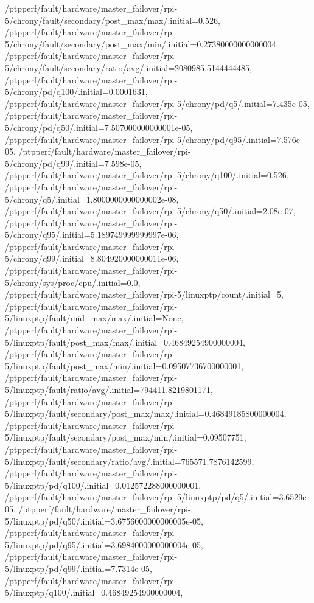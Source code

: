 {    /ptpperf/fault/hardware/master_failover/rpi-5/chrony/fault/secondary/post_max/max/.initial=0.526,
    /ptpperf/fault/hardware/master_failover/rpi-5/chrony/fault/secondary/post_max/min/.initial=0.27380000000000004,
    /ptpperf/fault/hardware/master_failover/rpi-5/chrony/fault/secondary/ratio/avg/.initial=2080985.5144444485,
    /ptpperf/fault/hardware/master_failover/rpi-5/chrony/pd/q100/.initial=0.0001631,
    /ptpperf/fault/hardware/master_failover/rpi-5/chrony/pd/q5/.initial=7.435e-05,
    /ptpperf/fault/hardware/master_failover/rpi-5/chrony/pd/q50/.initial=7.507000000000001e-05,
    /ptpperf/fault/hardware/master_failover/rpi-5/chrony/pd/q95/.initial=7.576e-05,
    /ptpperf/fault/hardware/master_failover/rpi-5/chrony/pd/q99/.initial=7.598e-05,
    /ptpperf/fault/hardware/master_failover/rpi-5/chrony/q100/.initial=0.526,
    /ptpperf/fault/hardware/master_failover/rpi-5/chrony/q5/.initial=1.8000000000000002e-08,
    /ptpperf/fault/hardware/master_failover/rpi-5/chrony/q50/.initial=2.08e-07,
    /ptpperf/fault/hardware/master_failover/rpi-5/chrony/q95/.initial=5.189749999999997e-06,
    /ptpperf/fault/hardware/master_failover/rpi-5/chrony/q99/.initial=8.804920000000011e-06,
    /ptpperf/fault/hardware/master_failover/rpi-5/chrony/sys/proc/cpu/.initial=0.0,
    /ptpperf/fault/hardware/master_failover/rpi-5/linuxptp/count/.initial=5,
    /ptpperf/fault/hardware/master_failover/rpi-5/linuxptp/fault/mid_max/max/.initial=None,
    /ptpperf/fault/hardware/master_failover/rpi-5/linuxptp/fault/post_max/max/.initial=0.46849254900000004,
    /ptpperf/fault/hardware/master_failover/rpi-5/linuxptp/fault/post_max/min/.initial=0.09507736700000001,
    /ptpperf/fault/hardware/master_failover/rpi-5/linuxptp/fault/ratio/avg/.initial=794411.8219801171,
    /ptpperf/fault/hardware/master_failover/rpi-5/linuxptp/fault/secondary/post_max/max/.initial=0.46849185800000004,
    /ptpperf/fault/hardware/master_failover/rpi-5/linuxptp/fault/secondary/post_max/min/.initial=0.09507751,
    /ptpperf/fault/hardware/master_failover/rpi-5/linuxptp/fault/secondary/ratio/avg/.initial=765571.7876142599,
    /ptpperf/fault/hardware/master_failover/rpi-5/linuxptp/pd/q100/.initial=0.012572288000000001,
    /ptpperf/fault/hardware/master_failover/rpi-5/linuxptp/pd/q5/.initial=3.6529e-05,
    /ptpperf/fault/hardware/master_failover/rpi-5/linuxptp/pd/q50/.initial=3.6756000000000005e-05,
    /ptpperf/fault/hardware/master_failover/rpi-5/linuxptp/pd/q95/.initial=3.6984000000000004e-05,
    /ptpperf/fault/hardware/master_failover/rpi-5/linuxptp/pd/q99/.initial=7.7314e-05,
    /ptpperf/fault/hardware/master_failover/rpi-5/linuxptp/q100/.initial=0.46849254900000004,
}
